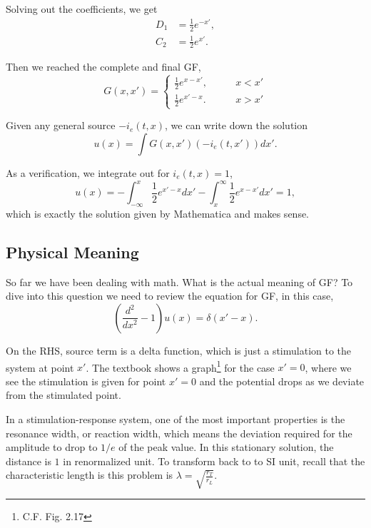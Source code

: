 \documentclass{tufte-handout}
\begin{document}
Solving out the coefficients, we get
\begin{align*}
    D_1 & = \frac{1}{2}e^{-x'},\\
    C_2 &= \frac{1}{2}e^{x'}.
\end{align*}

Then we reached the complete and final GF,
\begin{equation*}
    G(x,x') = \begin{cases}
    \frac{1}{2}e^{x-x'}, & \qquad x<x'\\
    \frac{1}{2}e^{x' - x}. & \qquad x>x'
    \end{cases}
\end{equation*}

Given any general source $-i_e(t,x)$, we can write down the solution
\begin{equation*}
    u(x) = \int G(x,x') (-i_e(t,x') ) dx'.
\end{equation*}

As a verification, we integrate out for $i_e(t,x) = 1$,
\begin{equation*}
    u(x) = -\int_{-\infty}^{x}  \frac{1}{2}e^{x'-x} dx' - \int_{x}^{\infty} \frac{1}{2}e^{x - x'} dx' = 1,
\end{equation*}
which is exactly the solution given by Mathematica and makes sense.


\subsection{Physical Meaning}

So far we have been dealing with math. What is the actual meaning of GF? To dive into this question we need to review the equation for GF, in this case,
\begin{equation*}
   \left(\frac{d^2}{dx^2} -1\right) u(x) = \delta(x'-x).
\end{equation*}

On the RHS, source term is a delta function, which is just a stimulation to the system at point $x'$. The textbook shows a graph\footnote{C.F. Fig. 2.17} for the case $x'=0$, where we see the stimulation is given for point $x'=0$ and the potential drops as we deviate from the stimulated point.

In a stimulation-response system, one of the most important properties is the resonance width, or reaction width, which means the deviation required for the amplitude to drop to $1/e$ of the peak value. In this stationary solution, the distance is $1$ in renormalized unit. To transform back to to SI unit, recall that the characteristic length is this problem is $\lambda = \sqrt{\frac{r_T}{r_L}}$.
\end{document}
